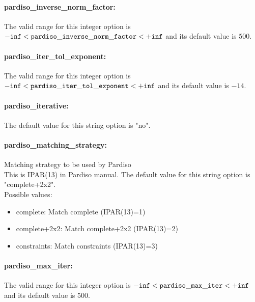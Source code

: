 \paragraph{pardiso\_inverse\_norm\_factor:}\label{sec:pardiso_inverse_norm_factor}  $\;$ \\
 The valid range for this integer option is
${\tt -inf} <  {\tt pardiso\_inverse\_norm\_factor } <  {\tt +inf}$
and its default value is $500$.

\paragraph{pardiso\_iter\_tol\_exponent:}\label{sec:pardiso_iter_tol_exponent}  $\;$ \\
 The valid range for this integer option is
${\tt -inf} <  {\tt pardiso\_iter\_tol\_exponent } <  {\tt +inf}$
and its default value is $-14$.

\paragraph{pardiso\_iterative:}\label{sec:pardiso_iterative}  $\;$ \\
The default value for this string option is "no".

\paragraph{pardiso\_matching\_strategy:}\label{sec:pardiso_matching_strategy} Matching strategy to be used by Pardiso $\;$ \\
 This is IPAR(13) in Pardiso manual.
The default value for this string option is "complete+2x2".
\\ 
Possible values:
\begin{itemize}
   \item complete: Match complete (IPAR(13)=1)
   \item complete+2x2: Match complete+2x2 (IPAR(13)=2)
   \item constraints: Match constraints (IPAR(13)=3)
\end{itemize}

\paragraph{pardiso\_max\_iter:}\label{sec:pardiso_max_iter}  $\;$ \\
 The valid range for this integer option is
${\tt -inf} <  {\tt pardiso\_max\_iter } <  {\tt +inf}$
and its default value is $500$.

